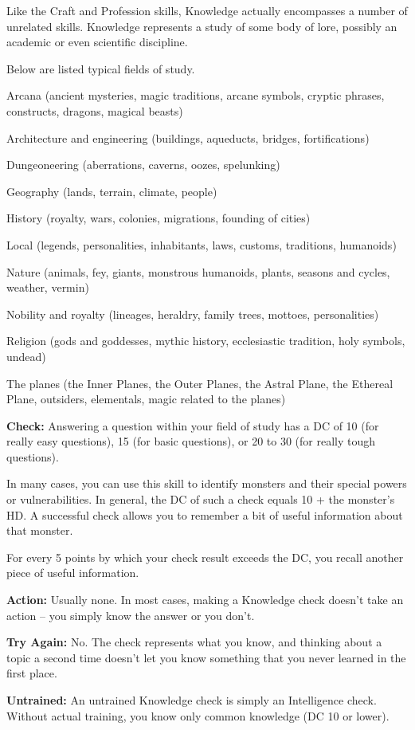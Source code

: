 
Like the Craft and Profession skills, Knowledge actually encompasses a number of unrelated skills. Knowledge represents a study of some body of lore, possibly an academic or even scientific discipline.

Below are listed typical fields of study.

\begin{itemize*}
\item Arcana (ancient mysteries, magic traditions, arcane symbols, cryptic phrases, constructs, dragons, magical beasts)
\item Architecture and engineering (buildings, aqueducts, bridges, fortifications)
\item Dungeoneering (aberrations, caverns, oozes, spelunking)
\item Geography (lands, terrain, climate, people)
\item History (royalty, wars, colonies, migrations, founding of cities)
\item Local (legends, personalities, inhabitants, laws, customs, traditions, humanoids)
\item Nature (animals, fey, giants, monstrous humanoids, plants, seasons and cycles, weather, vermin)
\item Nobility and royalty (lineages, heraldry, family trees, mottoes, personalities)
\item Religion (gods and goddesses, mythic history, ecclesiastic tradition, holy symbols, undead)
\end{itemize*}

The planes (the Inner Planes, the Outer Planes, the Astral Plane, the Ethereal Plane, outsiders, elementals, magic related to the planes)

\textbf{Check:} Answering a question within your field of study has a DC of 10 (for really easy questions), 15 (for basic questions), or 20 to 30 (for really tough questions).

In many cases, you can use this skill to identify monsters and their special powers or vulnerabilities. In general, the DC of such a check equals 10 + the monster's HD. A successful check allows you to remember a bit of useful information about that monster.

For every 5 points by which your check result exceeds the DC, you recall another piece of useful information.

\textbf{Action:} Usually none. In most cases, making a Knowledge check doesn't take an action -- you simply know the answer or you don't.

\textbf{Try Again:} No. The check represents what you know, and thinking about a topic a second time doesn't let you know something that you never learned in the first place.

\textbf{Untrained:} An untrained Knowledge check is simply an Intelligence check. Without actual training, you know only common knowledge (DC 10 or lower).
